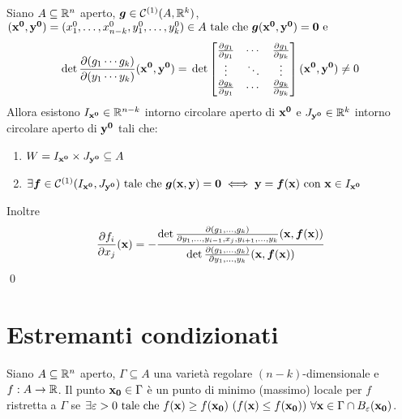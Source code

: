 \begin{theorem}
    Siano $A\subseteq \mathbb{R}^n$ aperto, $\bm g \in \mathcal{C}^{(1)}(A,\mathbb{R}^k)$, $(\vb{x^0}, \vb{y^0})=(x_1^0,\dots,x_{n-k}^0,y_1^0,\dots,y_{k}^0) \in A \text{ tale che } \bm g(\vb{x^0}, \vb{y^0})=\vb{0} \text{ e }$
    $$
        \det\frac{\partial(g_1\cdots g_k)}{\partial (y_1 \cdots y_k)}(\vb{x^0}, \vb{y^0})=\\
        \det\begin{bmatrix}
            \frac{\partial g_1}{\partial y_1} & \cdots & \frac{\partial g_1}{\partial y_k}\\
            \vdots & \ddots & \vdots \\
            \frac{\partial g_k}{\partial y_1} & \cdots & \frac{\partial g_k}{\partial y_k}
        \end{bmatrix}
        (\vb{x^0}, \vb{y^0}) \neq 0
    $$
    Allora esistono $I_{\vb{x^0}} \in \mathbb{R}^{n-k}$ intorno circolare aperto di $\vb{x^0}$ e $J_{\vb{y^0}} \in \mathbb{R}^k$ intorno circolare aperto di $\vb{y^0}$ tali che:
    \begin{enumerate}
        \item $W=I_{\vb{x^0}}\times J_{\vb{y^0}} \subseteq A$
        \item $\exists \bm f \in \mathcal{C}^{(1)}(I_{\vb{x^0}}, J_{\vb{y^0}}) \text{ tale che } \bm g(\vb{x}, \vb{y})=\vb{0} \iff \vb{y} = \bm f (\vb{x}) \text{ con } \vb{x} \in I_{\vb{x^0}}$
    \end{enumerate}
    Inoltre
    $$
        \frac{\partial f_i}{\partial x_j}(\vb{x})=-\frac
        {\det \frac{\partial (g_1,\dots,g_k)}{\partial y_1,\dots,y_{i-1},x_j,y_{i+1},\dots,y_k}(\vb{x},\bm f(\vb{x}))}
        {\det \frac{\partial (g_1,\dots,g_k)}{\partial y_1,\dots,y_k}(\vb{x},\bm f(\vb{x}))}
    $$
    \qed
\end{theorem}

\section{Estremanti condizionati}

\begin{definition}
    Siano $A\subseteq\mathbb{R}^n$ aperto, $\Gamma \subseteq A$ una varietà regolare $(n-k)$-dimensionale e $f: A\to\mathbb{R}$. Il punto $\vb{x_0} \in \Gamma$ è un punto di minimo (massimo) locale per $f$ ristretta a $\Gamma$ se $\exists \varepsilon > 0 \text{ tale che } f(\vb{x}) \geq f(\vb{x_0}) \ (f(\vb{x}) \leq f(\vb{x_0})) \ \forall \vb{x} \in \Gamma \cap B_\varepsilon(\vb{x_0})$.
\end{definition}

